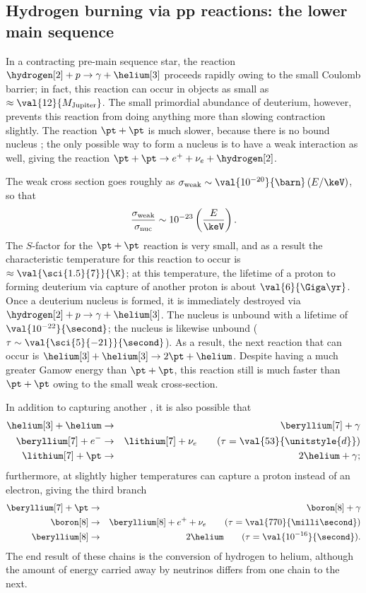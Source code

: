 \subsection{Hydrogen burning via pp reactions: the lower main sequence}

In a contracting pre-main sequence star, the reaction $\hydrogen[2]+p\to\gamma+\helium[3]$ proceeds rapidly owing to the small Coulomb barrier; in fact, this reaction can occur in objects as small as $\approx \val{12}{M_{\mathrm{Jupiter}}}$.  The small primordial abundance of deuterium, however, prevents this reaction from doing anything more than slowing contraction slightly.  The reaction $\pt +\pt$ is much slower, because there is no bound nucleus \helium[2]; the only possible way to form a nucleus is to have a weak interaction as well, giving the reaction $\pt+\pt\to e^{+}+\nu_{e}+\hydrogen[2]$.

The weak cross section goes roughly as $\sigma_{\mathrm{weak}} \sim \val{10^{-20}}{\barn}\left(E/\keV\right)$, so that
\[ \frac{\sigma_{\mathrm{weak}}}{\sigma_{\mathrm{nuc}}} \sim 10^{-23}\left(\frac{E}{\keV}\right). \]
The $S$-factor for the $\pt+\pt$ reaction is very small, and as a result the characteristic temperature for this reaction to occur is $\approx \val{\sci{1.5}{7}}{\K}$; at this temperature, the lifetime of a proton to forming deuterium via capture of another proton is about $\val{6}{\Giga\yr}$.  Once a deuterium nucleus is formed, it is immediately destroyed via $\hydrogen[2]+p\to\gamma+\helium[3]$. The nucleus \lithium[4] is unbound with a lifetime of $\val{10^{-22}}{\second}$; the nucleus \beryllium[6] is likewise unbound ($\tau \sim \val{\sci{5}{-21}}{\second}$). As a result, the next reaction that can occur is $\helium[3]+\helium[3]\to 2\pt+\helium$.  Despite having a much greater Gamow energy than $\pt + \pt$, this reaction still is much faster than $\pt+\pt$ owing to the small weak cross-section.

In addition to capturing another \helium[3], it is also possible that
\begin{eqnarray}
\helium[3] + \helium &\to& \beryllium[7] + \gamma\nonumber\\
 \beryllium[7] + e^{-} &\to& \lithium[7] +  \nu_{e}\qquad(\tau=\val{53}{\unitstyle{d}})\nonumber \\
 \lithium[7] + \pt &\to& 2\helium + \gamma;
 \end{eqnarray}
furthermore, at slightly higher temperatures \beryllium[7] can capture a proton instead of an electron, giving the third branch
\begin{eqnarray}
\beryllium[7] + \pt &\to& \boron[8] + \gamma\nonumber\\
\boron[8] &\to& \beryllium[8] + e^{+} + \nu_{e}\qquad(\tau = \val{770}{\milli\second})\nonumber\\
\beryllium[8] &\to& 2\helium\qquad(\tau= \val{10^{-16}}{\second}).
\end{eqnarray}
 The end result of these chains is the conversion of hydrogen to helium, although the amount of energy carried away by neutrinos differs from one chain to the next.


